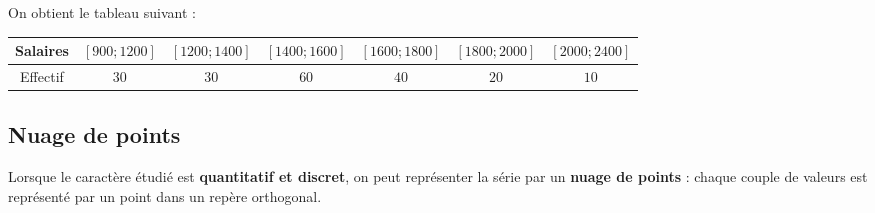 \begin{ex}{}{}
On obtient le tableau suivant :
\begin{center}
\begin{tabular}{|*{7}{c|}}
\hline
Salaires & $[900;1200]$ &$[1200;1400]$& $[1400;1600]$ &$[1600;1800]$ & $[1800;2000]$ & $[2000;2400]$ \\\hline
Effectif & $30$ & $30$ & $60$ & $40$ & $20$ & $10$ \\\hline
\end{tabular}
\end{center}
\end{ex}

\newpage
\subsection{Nuage de points}

   Lorsque le caractère étudié est \textbf{quantitatif et discret}, on peut représenter la série par un \textbf{nuage de points} : chaque couple de valeurs est représenté par un point dans un repère orthogonal.

